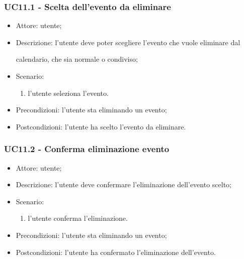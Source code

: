 \subsubsection{UC11.1 - Scelta dell'evento da eliminare} \label{sec: UC11.1}
\begin{itemize}
    \item Attore: utente;
    \item Descrizione: l'utente deve poter scegliere l'evento che vuole eliminare dal \par calendario, che sia normale o condiviso;
    \item Scenario:
        \begin{enumerate}
        \item l'utente seleziona l'evento.
        \end{enumerate}
    
    \item Precondizioni: l'utente sta eliminando un evento;
    \item Postcondizioni: l'utente ha scelto l'evento da eliminare.
\end{itemize}


\subsubsection{UC11.2 - Conferma eliminazione evento} \label{sec: UC11.2}
\begin{itemize}
    \item Attore: utente;
    \item Descrizione: l'utente deve confermare l'eliminazione dell'evento scelto;
    \item Scenario:
        \begin{enumerate}
        \item l'utente conferma l'eliminazione.
        \end{enumerate}
    
    \item Precondizioni: l'utente sta eliminando un evento;
    \item Postcondizioni: l'utente ha confermato l'eliminazione dell'evento.
\end{itemize}


